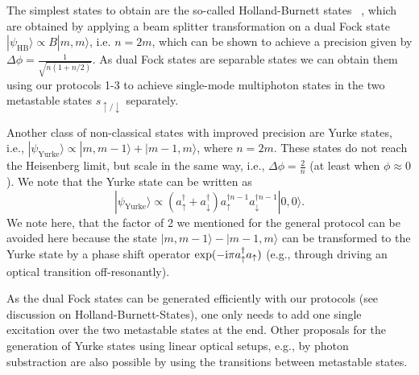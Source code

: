 \documentclass[twocolumn,pra,aps,superscriptaddress,showpacs]{revtex4-1}
\newcommand{\ket}[1]{|#1\rangle}
\def\ii{\mathord{\rm i}}
\begin{document}
The simplest states to obtain are the so-called Holland-Burnett states~ \cite{holland93,campos03,cooper10}, which are obtained by applying a beam splitter transformation on a dual Fock state $\ket{\psi_\mathrm{HB}} \propto B \ket{m,m}$, i.e. $n=2m$, which can be shown to achieve a precision given by $\Delta \phi = \frac{1}{\sqrt{n(1+n/2)}}$. As dual Fock states are separable states we can obtain them using our protocols 1-3 to achieve single-mode multiphoton states in the two metastable states $s_{\uparrow/\downarrow}$ separately.

Another class of non-classical states with improved precision are Yurke states, i.e., $\ket{\psi_\mathrm{Yurke}}  \propto \ket{m,m-1} + \ket{m-1,m}$, where $n = 2m$. These states  do not reach the Heisenberg limit, but scale in the same way, i.e., $\Delta \phi = \frac{2}{n}$ \cite{yurke86} (at least when $\phi \approx 0$). We note that the Yurke state can be written as
\begin{equation}
	\ket{\psi_\mathrm{Yurke}}
	\propto  (a_\uparrow^\dagger + a_\downarrow^\dagger) a_\uparrow^{\dagger n-1} a_\downarrow^{\dagger n-1} \ket{0,0}.
\end{equation}
We note here, that the factor of 2 we mentioned for the general protocol can be avoided here because the state $\ket{m,m-1}-\ket{m-1,m}$ can be transformed to the Yurke state by a phase shift operator $\exp(-\ii \pi a_\uparrow^\dagger a_\uparrow)$ (e.g., through driving an optical transition off-resonantly).

As the dual Fock states can be generated efficiently with our protocols (see discussion on Holland-Burnett-States), one only needs to add one single excitation over the two metastable states at the end. Other proposals for the generation of Yurke states using linear optical setups, e.g., by photon substraction \cite{ono16} are also possible by using the transitions between metastable states.
\end{document}
